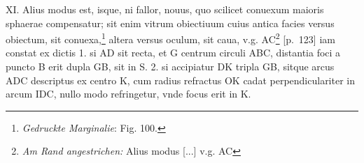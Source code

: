 \pend \pstart [p.~122] XI. Alius modus est, isque, ni fallor, nouus, quo scilicet conuexum maioris sphaerae compensatur; sit enim vitrum obiectiuum cuius antica facies versus obiectum, sit conuexa,\footnote{\textit{Gedruckte Marginalie}: Fig. 100.} altera versus oculum\protect{}, sit caua, v.g. AC\footnote{\textit{Am Rand angestrichen:} Alius modus [...] v.g. AC} [p.~123] iam constat ex dictis 1. si AD sit recta, et G centrum circuli ABC, distantia foci\protect{} a puncto B erit dupla GB, sit in S. 2. si accipiatur DK tripla GB, sitque arcus ADC descriptus ex centro K, cum radius refractus\protect{} OK cadat perpendiculariter in arcum IDC, nullo modo refringetur, vnde focus erit in K.